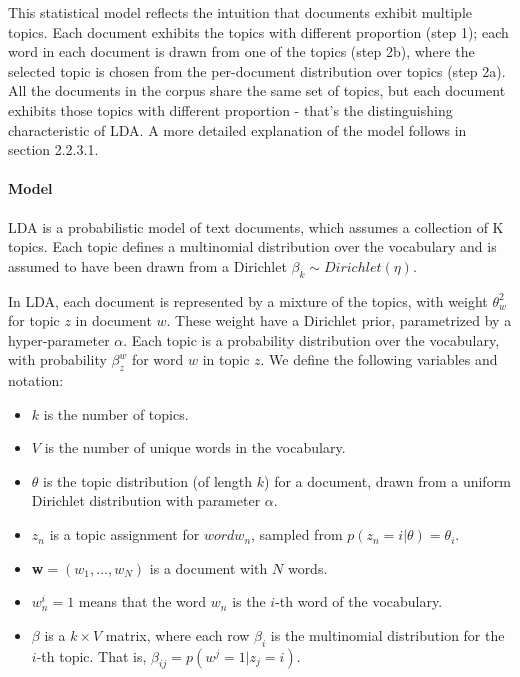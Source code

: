 \documentclass[12pt]{report}
\begin{document}
This statistical model reflects the intuition that documents exhibit multiple
topics. Each document exhibits the topics with different proportion (step 1);
each word in each document is drawn from one of the topics (step 2b), where the
selected topic is chosen from the per-document distribution over topics (step
2a). All the documents in the corpus share the same set of topics, but each
document exhibits those topics with different proportion - that’s the
distinguishing characteristic of LDA. A more detailed explanation of the model
follows in section 2.2.3.1.

\paragraph{Model}

LDA is a probabilistic model of text documents, which assumes a collection of 
K topics. Each topic defines a multinomial distribution over the vocabulary 
and is assumed to have been drawn from a Dirichlet 
$\beta_k \sim Dirichlet(\eta)$.

In LDA, each document is represented by a mixture of the topics, with weight
$\theta_w^2$ for topic $z$ in document $w$. These weight have a Dirichlet prior,
parametrized by a hyper-parameter $\alpha$. Each topic is a probability
distribution over the vocabulary, with probability $\beta^w_z$ for word $w$ in
topic $z$. We define the following variables and notation:
\begin{itemize}
  \item[] $k$ is the number of topics.
  \item[] $V$ is the number of unique words in the vocabulary.
  \item[] $\theta$  is the topic distribution (of length $k$) for a document,
   drawn from a uniform Dirichlet distribution with parameter $\alpha$.
  \item[] $z_{n}$ is a topic assignment for $word w_{n}$, sampled from 
  $p(z_{n} = i|\theta) = \theta_{i}$.
  \item[] \textbf{w}$ = (w_{1}, ... , w_{N})$ is a document with $N$ words.
  \item[] $w_{n}^{i} = 1$ means that the word $w_{n}$ is the $i$-th word 
  of the vocabulary.
  \item[] $\beta$  is a $k \times V$ matrix, where each row $\beta_{i}$ 
  is the multinomial distribution for the $i$-th topic. That is, 
  $\beta_{ij} = p(w^{j} = 1 | z_{j} = i)$.
\end{itemize}
\end{document}
